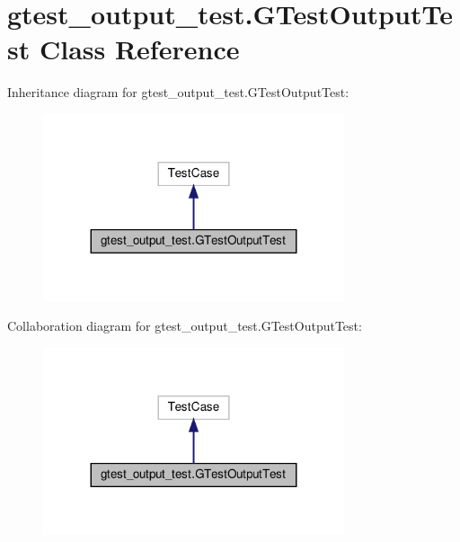 \hypertarget{classgtest__output__test_1_1_g_test_output_test}{}\section{gtest\+\_\+output\+\_\+test.\+G\+Test\+Output\+Test Class Reference}
\label{classgtest__output__test_1_1_g_test_output_test}


Inheritance diagram for gtest\+\_\+output\+\_\+test.\+G\+Test\+Output\+Test\+:
\nopagebreak
\begin{figure}[H]
\begin{center}
\leavevmode
\includegraphics[width=251pt]{classgtest__output__test_1_1_g_test_output_test__inherit__graph}
\end{center}
\end{figure}


Collaboration diagram for gtest\+\_\+output\+\_\+test.\+G\+Test\+Output\+Test\+:
\nopagebreak
\begin{figure}[H]
\begin{center}
\leavevmode
\includegraphics[width=251pt]{classgtest__output__test_1_1_g_test_output_test__coll__graph}
\end{center}
\end{figure}
